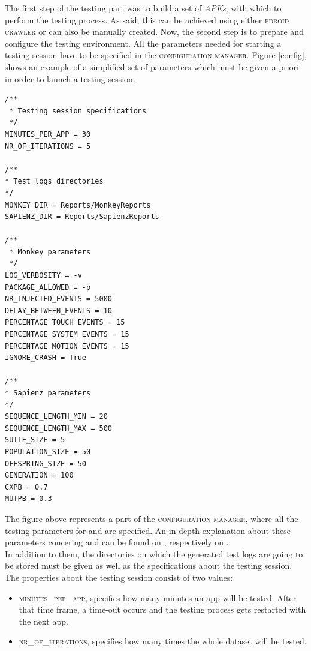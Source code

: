 The first step of the testing part was to build a set of \textit{APKs}, with which to perform the testing process. As said, this can be achieved using either \textsc{fdroid crawler} or can also be manually created. Now, the second step is to prepare and configure the testing environment. 
All the parameters needed for starting a testing session have to be specified in the \textsc{configuration manager}. Figure \ref{config}, shows an example of a simplified set of parameters which must be given a priori in order to launch a testing session. \newpage
\label{config}
\begin{lstlisting}[caption=Properties which get elaborated during the testing sessions]
/**
 * Testing session specifications
 */
MINUTES_PER_APP = 30
NR_OF_ITERATIONS = 5
 
/**
* Test logs directories
*/
MONKEY_DIR = Reports/MonkeyReports
SAPIENZ_DIR = Reports/SapienzReports

/**
 * Monkey parameters
 */
LOG_VERBOSITY = -v 
PACKAGE_ALLOWED = -p
NR_INJECTED_EVENTS = 5000
DELAY_BETWEEN_EVENTS = 10
PERCENTAGE_TOUCH_EVENTS = 15
PERCENTAGE_SYSTEM_EVENTS = 15
PERCENTAGE_MOTION_EVENTS = 15
IGNORE_CRASH = True

/**
* Sapienz parameters
*/
SEQUENCE_LENGTH_MIN = 20
SEQUENCE_LENGTH_MAX = 500
SUITE_SIZE = 5
POPULATION_SIZE = 50
OFFSPRING_SIZE = 50
GENERATION = 100
CXPB = 0.7
MUTPB = 0.3
\end{lstlisting}
The figure above represents a part of the \textsc{configuration manager}, where all the testing parameters for \monkey and \sapienz are specified. An in-depth explanation about these parameters concering \monkey and \sapienz can be found on \cite{monkey}, respectively on \cite{sapienz}.\\
In addition to them, the directories on which the generated test logs are going to be stored must be given as well as the specifications about the testing session. The properties about the testing session consist of two values: 
\begin{itemize}
\item \textsc{minutes\_per\_app}, specifies how many minutes an app will be tested. After that time frame, a time-out occurs and the testing process gets restarted with the next app. 
\item \textsc{nr\_of\_iterations}, specifies how many times the whole dataset will be tested.
\end{itemize}


